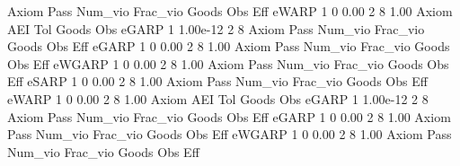 {\smallskip}
{\smallskip}
{\smallskip}
       Axiom {\VBAR} Pass     Num_vio    Frac_vio       Goods         Obs         Eff  
       eWARP {\VBAR}    1           0        0.00           2           8        1.00  
{\smallskip}
       Axiom {\VBAR}       AEI        Tol      Goods        Obs 
       eGARP {\VBAR}         1   1.00e-12          2          8 
{\smallskip}
{\smallskip}
{\smallskip}
       Axiom {\VBAR} Pass     Num_vio    Frac_vio       Goods         Obs         Eff  
       eGARP {\VBAR}    1           0        0.00           2           8        1.00  
{\smallskip}
{\smallskip}
{\smallskip}
       Axiom {\VBAR} Pass     Num_vio    Frac_vio       Goods         Obs         Eff  
      eWGARP {\VBAR}    1           0        0.00           2           8        1.00  
{\smallskip}
{\smallskip}
{\smallskip}
       Axiom {\VBAR} Pass     Num_vio    Frac_vio       Goods         Obs         Eff  
       eSARP {\VBAR}    1           0        0.00           2           8        1.00  
{\smallskip}
{\smallskip}
{\smallskip}
       Axiom {\VBAR} Pass     Num_vio    Frac_vio       Goods         Obs         Eff  
       eWARP {\VBAR}    1           0        0.00           2           8        1.00  
{\smallskip}
       Axiom {\VBAR}       AEI        Tol      Goods        Obs 
       eGARP {\VBAR}         1   1.00e-12          2          8 
{\smallskip}
{\smallskip}
{\smallskip}
       Axiom {\VBAR} Pass     Num_vio    Frac_vio       Goods         Obs         Eff  
       eGARP {\VBAR}    1           0        0.00           2           8        1.00  
{\smallskip}
{\smallskip}
{\smallskip}
       Axiom {\VBAR} Pass     Num_vio    Frac_vio       Goods         Obs         Eff  
      eWGARP {\VBAR}    1           0        0.00           2           8        1.00  
{\smallskip}
{\smallskip}
{\smallskip}
       Axiom {\VBAR} Pass     Num_vio    Frac_vio       Goods         Obs         Eff  
